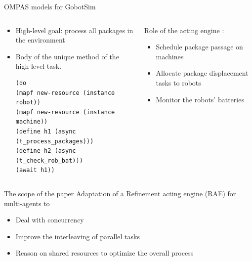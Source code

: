 \begin{frame}[fragile]{OMPAS models for GobotSim}
\begin{columns}
    \begin{column}{0.5\textwidth}
        \begin{itemize}
            \item High-level goal: process all packages in the environment
            \item Body of the unique method of the high-level task.
            \setlength{\leftmargini}{0pt}

            \tiny
        \begin{lstlisting}
(do
(mapf new-resource (instance robot))
(mapf new-resource (instance machine))
(define h1 (async (t_process_packages)))
(define h2 (async (t_check_rob_bat)))
(await h1))
        \end{lstlisting}    
        \end{itemize}


        
    \end{column}
    \begin{column}{0.5\textwidth}
Role of the acting engine : 
\begin{itemize}
\item Schedule package passage on machines
\item Allocate package displacement tasks to robots
\item Monitor the robots' batteries 
\end{itemize} 
\end{column}
\end{columns}

\end{frame}


\begin{frame}{The scope of the paper}
    Adaptation of a Refinement acting engine (RAE) for multi-agents to
    \begin{itemize}
        \item Deal with concurrency
        \item Improve the interleaving of parallel tasks
        \item Reason on shared resources to optimize the overall process
    \end{itemize}
\end{frame}

